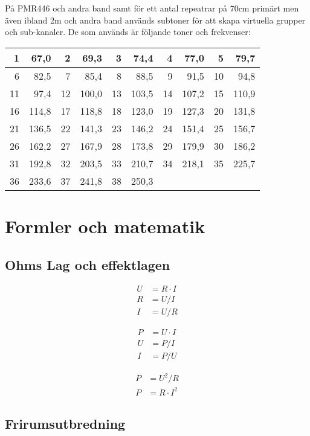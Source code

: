 \documentclass[12pt,swedish,a4paper]{article}
\begin{document}
På PMR446 och andra band samt för ett antal repeatrar på 70cm primärt men även ibland 2m och andra band används subtoner för att skapa virtuella grupper och sub-kanaler. De som används är följande toner och frekvenser:

\begin{tabular}{rr|rr|rr|rr|rr}
	 1 &  67,0 &  2 &  69,3 &  3 &  74,4 &  4 &  77,0 &  5 &  79,7 \\ \hline
	 6 &  82,5 &  7 &  85,4 &  8 &  88,5 &  9 &  91,5 & 10 &  94,8 \\ \hline
	11 &  97,4 & 12 & 100,0 & 13 & 103,5 & 14 & 107,2 & 15 & 110,9 \\ \hline
	16 & 114,8 & 17 & 118,8 & 18 & 123,0 & 19 & 127,3 & 20 & 131,8 \\ \hline
	21 & 136,5 & 22 & 141,3 & 23 & 146,2 & 24 & 151,4 & 25 & 156,7 \\ \hline
	26 & 162,2 & 27 & 167,9 & 28 & 173,8 & 29 & 179,9 & 30 & 186,2 \\ \hline
	31 & 192,8 & 32 & 203,5 & 33 & 210,7 & 34 & 218,1 & 35 & 225,7 \\ \hline
	36 & 233,6 & 37 & 241,8 & 38 & 250,3 &    &       &    &
\end{tabular}



\section{Formler och matematik}

\subsection{Ohms Lag och effektlagen}

\begin{align}
U &= R\cdot I\\
R &= U/I\\
I &= U/R
\end{align}

\begin{align}
P &= U \cdot I\\
U &= P/I\\
I &= P/U
\end{align}

\begin{align}
P &= U^2/R\\
P &= R \cdot I^2
\end{align}

\subsection{Frirumsutbredning}
\end{document}
